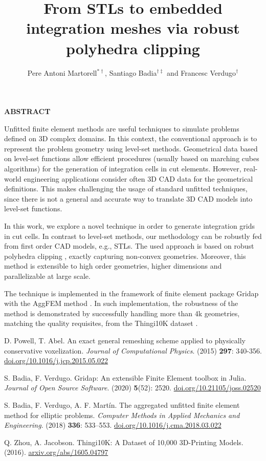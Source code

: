 \documentclass{coupled2019_abstract}
\title{From STLs to embedded integration meshes via robust polyhedra clipping}
\author{Pere Antoni Martorell$^{*\dag}$, Santiago Badia$^{\dag\ddag}$ and Francesc Verdugo$^{\dag}$ }
\begin{document}
\begin{center}
\bf ABSTRACT
\end{center}

Unfitted finite element methods are useful techniques to simulate problems defined on 3D complex domains. 
In this context, the conventional approach is to represent the problem geometry using level-set methods. 
Geometrical data based on level-set functions allow efficient procedures (usually based on marching cubes algorithms) for the generation of integration cells in cut elements. 
However, real-world engineering applications consider often 3D CAD data for the geometrical definitions. 
This makes challenging the usage of standard unfitted techniques, since there is not a general and accurate way to translate 3D CAD models into level-set functions.

In this work, we explore a novel technique in order to generate integration grids in cut cells.
In contrast to level-set methods, our methodology can be robustly fed from first order CAD models, e.g., STLs.
The used approach is based on robust polyhedra clipping \cite{Powel}, exactly capturing non-convex geometries.
Moreover, this method is extensible to high order geometries, higher dimensions and parallelizable at large scale.

The technique is implemented in the framework of finite element package Gridap \cite{Gridap} with the AggFEM method \cite{AgFEM}. In such implementation, the robustness of the method is demonstrated by successfully handling more than 4k geometries, matching the quality requisites, from the Thingi10K dataset \cite{10k}.


\begin{thebibliography}{99}

D. Powell, T. Abel. 
An exact general remeshing scheme applied to physically conservative voxelization.
\textit{Journal of Computational Physics}.
(2015) \textbf{297}: 340-356. 
\url{doi.org/10.1016/j.jcp.2015.05.022}

S. Badia, F. Verdugo.
Gridap: An extensible Finite Element toolbox in Julia.
\textit{Journal of Open Source Software}. 
(2020) \textbf{5}(52): 2520.
\url{doi.org/10.21105/joss.02520}

S. Badia, F. Verdugo, A. F. Mart\'in.
The aggregated unfitted finite element method for elliptic problems.
\textit{Computer Methods in Applied Mechanics and Engineering}. 
(2018) \textbf{336}: 533--553. 
\url{doi.org/10.1016/j.cma.2018.03.022}

Q. Zhou, A. Jacobson. 
Thingi10K: A Dataset of 10,000 3D-Printing Models.
(2016).
\url{arxiv.org/abs/1605.04797}

\end{thebibliography}
\end{document}
